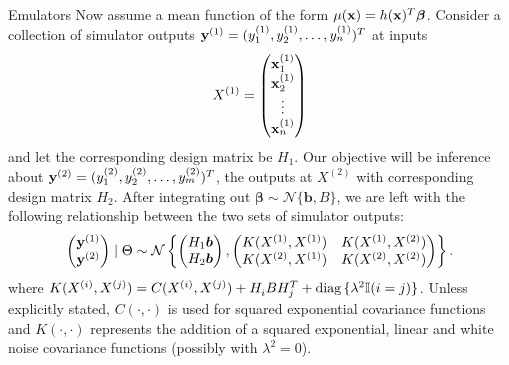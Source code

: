 \begin{chapter}{Emulators \label{Ch:Emulators}}
Now assume a mean function of the form $\mu(\mathbf{x}) = h(\mathbf{x})^T \bm{\beta}$. Consider a collection of simulator outputs $\mathbf{y}^{(1)} = (y_1^{(1)}, y_2^{(1)}, \ldots, y_n^{(1)})^T$ at inputs
\begin{equation}
  X^{(1)} = \begin{pmatrix} \mathbf{x}_1^{(1)} \\ \mathbf{x}_2^{(1)} \\ \vdots \\ \mathbf{x}_n^{(1)} \end{pmatrix}
\end{equation} and let the corresponding design matrix be $H_1$. Our objective will be inference about $\mathbf{y}^{(2)} = (y_1^{(2)}, y_2^{(2)}, \ldots, y_m^{(2)})^T$, the outputs at $X^{(2)}$ with corresponding design matrix $H_2$. After integrating out $\bm{\beta} \sim \mathcal{N}\{ \bm{b}, B\}$, we are left with the following relationship between the two sets of simulator outputs:
\begin{equation}
  \begin{pmatrix}
    \mathbf{y}^{(1)} \\ \mathbf{y}^{(2)}
  \end{pmatrix} \mid \Theta \sim \mathcal{N} \left\{
   \begin{pmatrix}
    H_1 \bm{b} \\ H_2 \bm{b}
  \end{pmatrix}, \begin{pmatrix} K(X^{(1)}, X^{(1)}) & K(X^{(1)}, X^{(2)}) \\
K(X^{(2)}, X^{(1)}) & K(X^{(2)}, X^{(2)}) \end{pmatrix} \right\}.
\end{equation}
where $K(X^{(i)}, X^{(j)}) = C(X^{(i)}, X^{(j)}) + H^{}_i B H_j^T + \text{diag}\,  \{ \lambda^2 \mathbb{I}(i = j) \}$. Unless explicitly stated, $C(\cdot, \cdot)$ is used for squared exponential covariance functions and $K(\cdot, \cdot)$ represents the addition of a squared exponential, linear and white noise covariance functions (possibly with $\lambda^2 = 0$).


\end{chapter}
